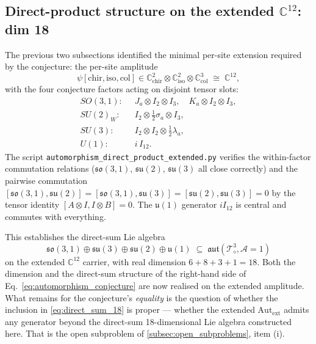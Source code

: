 \subsection{Direct-product structure on the extended $\mathbb{C}^{12}$: dim 18}
\label{subsec:direct_product_C12}

The previous two subsections identified the minimal per-site
extension required by the conjecture: the per-site amplitude
\begin{equation}
\label{eq:c12_amplitude}
\psi[\text{chir}, \text{iso}, \text{col}] \in
\mathbb{C}^2_\text{chir} \otimes \mathbb{C}^2_\text{iso} \otimes
\mathbb{C}^3_\text{col} \;\cong\; \mathbb{C}^{12},
\end{equation}
with the four conjecture factors acting on disjoint tensor slots:
\begin{align*}
SO(3,1):\;\;& J_a \otimes I_2 \otimes I_3,\quad
              K_a \otimes I_2 \otimes I_3,\\
SU(2)_W:\;\; & I_2 \otimes \tfrac{1}{2}\sigma_a \otimes I_3,\\
SU(3):\;\;   & I_2 \otimes I_2 \otimes \tfrac{1}{2}\lambda_a,\\
U(1):\;\;    & i\,I_{12}.
\end{align*}
The script \nolinkurl{automorphism_direct_product_extended.py}
verifies the within-factor commutation relations
($\mathfrak{so}(3,1)$, $\mathfrak{su}(2)$, $\mathfrak{su}(3)$ all
close correctly) and the pairwise commutation
$[\mathfrak{so}(3,1), \mathfrak{su}(2)] = [\mathfrak{so}(3,1),
\mathfrak{su}(3)] = [\mathfrak{su}(2), \mathfrak{su}(3)] = 0$ by
the tensor identity $[A \otimes I, I \otimes B] = 0$.  The
$\mathfrak{u}(1)$ generator $i I_{12}$ is central and commutes with
everything.

This establishes the direct-sum Lie algebra
\begin{equation}
\label{eq:direct_sum_18}
\mathfrak{so}(3,1) \oplus \mathfrak{su}(3) \oplus
\mathfrak{su}(2) \oplus \mathfrak{u}(1)
\;\subseteq\; \mathfrak{aut}(\mathcal{T}_\diamond^3,
\mathcal{A}=1)
\end{equation}
on the extended $\mathbb{C}^{12}$ carrier, with real dimension
$6 + 8 + 3 + 1 = 18$.  Both the dimension and the direct-sum
structure of the right-hand side of
Eq.~\eqref{eq:automorphism_conjecture} are now realised on the
extended amplitude.  What remains for the conjecture's
\emph{equality} is the question of whether the inclusion in
\eqref{eq:direct_sum_18} is proper --- whether the extended
$\mathrm{Aut}_\text{ext}$ admits any generator beyond the
direct-sum 18-dimensional Lie algebra constructed here.  That is
the open subproblem of
\autoref{subsec:open_subproblems}, item (i).

